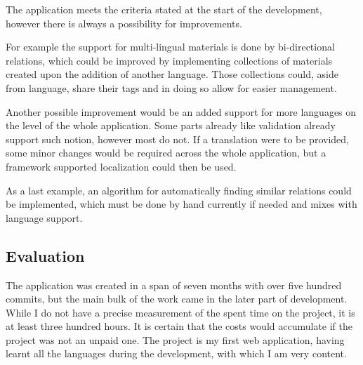 \documentclass[
  digital,     %
  oneside,     %
  nosansbold,  %
  colorbold, %
  lof,         %
  lot,         %
]{fithesis4}
\begin{document}
The application meets the criteria stated at the start of the development, however there is always a possibility for improvements.

For example the support for multi-lingual materials is done by bi-directional relations, which could be improved by implementing collections of materials created upon the addition of another language. Those collections could, aside from language, share their tags and in doing so allow for easier management.

Another possible improvement would be an added support for more languages on the level of the whole application. Some parts already like validation already support such notion, however most do not. If a translation were to be provided, some minor changes would be required across the whole application, but a framework supported localization could then be used.

As a last example, an algorithm for automatically finding similar relations could be implemented, which must be done by hand currently if needed and mixes with language support.

\subsection{Evaluation}

The application was created in a span of seven months with over five hundred commits, but the main bulk of the work came in the later part of development. While I do not have a precise measurement of the spent time on the project, it is at least three hundred hours. It is certain that the costs would accumulate if the project was not an unpaid one. The project is my first web application, having learnt all the languages during the development, with which I am very content.

\printbibliography[heading=bibintoc] %


\end{document}
